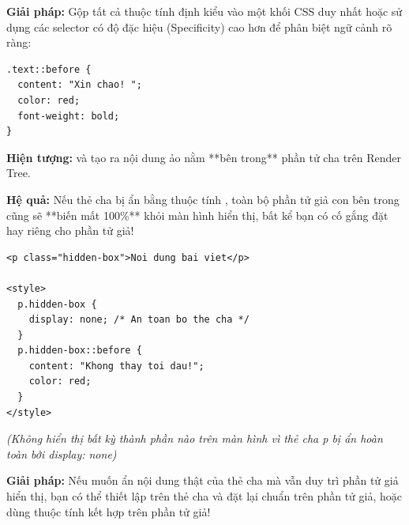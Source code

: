 \begin{tipBox}
\textbf{Giải pháp:} Gộp tất cả thuộc tính định kiểu vào một khối CSS duy nhất hoặc sử dụng các selector có độ đặc hiệu (Specificity) cao hơn để phân biệt ngữ cảnh rõ ràng:
\begin{codeWindow}
\begin{lstlisting}[language=CSS3]
.text::before {
  content: "Xin chao! ";
  color: red;
  font-weight: bold;
}
\end{lstlisting}
\end{codeWindow}
\end{tipBox}

\begin{conceptBox}
\textbf{Hiện tượng:}  và  tạo ra nội dung ảo nằm **bên trong** phần tử cha trên Render Tree.
\par\vspace{4pt}
\textbf{Hệ quả:} Nếu thẻ cha bị ẩn bằng thuộc tính , toàn bộ phần tử giả con bên trong cũng sẽ **biến mất 100\%** khỏi màn hình hiển thị, bất kể bạn có cố gắng đặt  hay  riêng cho phần tử giả!
\end{conceptBox}

\begin{codeWindow}
\begin{lstlisting}[language=HTML5]
<p class="hidden-box">Noi dung bai viet</p>

<style>
  p.hidden-box {
    display: none; /* An toan bo the cha */
  }
  p.hidden-box::before {
    content: "Khong thay toi dau!";
    color: red;
  }
</style>
\end{lstlisting}
\end{codeWindow}

\begin{browserWindow}
\sffamily\small
\textit{(Không hiển thị bất kỳ thành phần nào trên màn hình vì thẻ cha p bị ẩn hoàn toàn bởi display: none)}
\end{browserWindow}

\begin{tipBox}
\textbf{Giải pháp:} Nếu muốn ẩn nội dung thật của thẻ cha mà vẫn duy trì phần tử giả hiển thị, bạn có thể thiết lập  trên thẻ cha và đặt lại  chuẩn trên phần tử giả, hoặc dùng thuộc tính  kết hợp  trên phần tử giả!
\end{tipBox}


